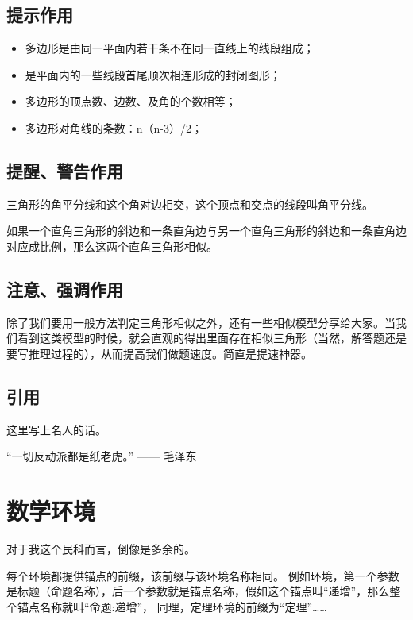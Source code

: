 \documentclass{morelull}
\begin{document}
\subsection{提示作用}
\begin{提示}
    \begin{itemize}
    \item{多边形是由同一平面内若干条不在同一直线上的线段组成；}
    \item{是平面内的一些线段首尾顺次相连形成的封闭图形；}
    \item{多边形的顶点数、边数、及角的个数相等；}
    \item{多边形对角线的条数：n（n-3）/2；}
    \end{itemize}
\end{提示}

\subsection{提醒、警告作用}
\begin{提醒}
    三角形的角平分线和这个角对边相交，这个顶点和交点的线段叫角平分线。

    如果一个直角三角形的斜边和一条直角边与另一个直角三角形的斜边和一条直角边对应成比例，那么这两个直角三角形相似。
\end{提醒}

\subsection{注意、强调作用}
\begin{注意}
除了我们要用一般方法判定三角形相似之外，还有一些相似模型分享给大家。当我们看到这类模型的时候，就会直观的得出里面存在相似三角形（当然，解答题还是要写推理过程的），从而提高我们做题速度。简直是提速神器。
\end{注意}

\subsection{引用}
\begin{引用}
    这里写上名人的话。

    “一切反动派都是纸老虎。” —— 毛泽东
\end{引用}

\section{数学环境}
对于我这个民科而言，倒像是多余的。

每个环境都提供锚点的前缀，该前缀与该环境名称相同。
例如环境，第一个参数是标题（命题名称），后一个参数就是锚点名称，假如这个锚点叫“递增”，那么整个锚点名称就叫“命题:递增”，
同理，定理环境的前缀为“定理”……
\end{document}
